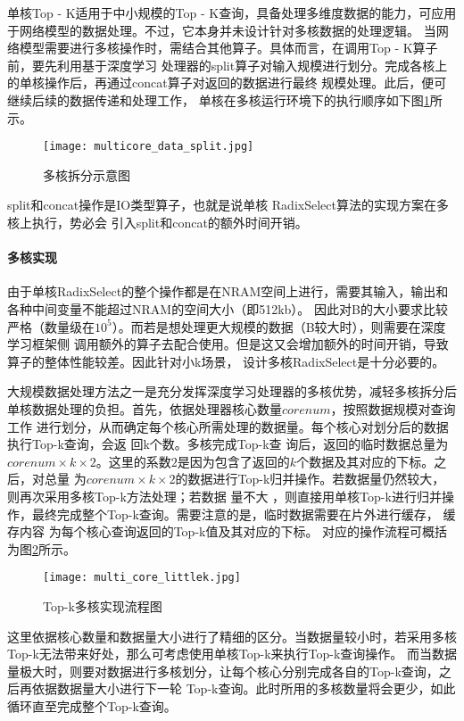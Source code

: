 单核Top - K适用于中小规模的Top - K查询，具备处理多维度数据的能力，可应用于网络模型的数据处理。不过，它本身并未设计针对多核数据的处理逻辑。
当网络模型需要进行多核操作时，需结合其他算子。具体而言，在调用Top - K算子前，要先利用基于深度学习
处理器的split算子对输入规模进行划分。完成各核上的单核操作后，再通过concat算子对返回的数据进行最终
规模处理。此后，便可继续后续的数据传递和处理工作，
单核在多核运行环境下的执行顺序如下图\ref{fig:duohe_split}所示。
\begin{figure}[ht]
    \centering
    \texttt{[image: multicore\_data\_split.jpg]}
    \caption{多核拆分示意图}
    \label{fig:duohe_split}
\end{figure}

split和concat操作是IO类型算子，也就是说单核 RadixSelect算法的实现方案在多核上执行，势必会
引入split和concat的额外时间开销。


\paragraph{多核实现}
由于单核RadixSelect的整个操作都是在NRAM空间上进行，需要其输入，输出和各种中间变量不能超过NRAM的空间大小（即512kb）。
因此对B的大小要求比较严格（数量级在$10^5$）。而若是想处理更大规模的数据（B较大时），则需要在深度学习框架侧
调用额外的算子去配合使用。但是这又会增加额外的时间开销，导致算子的整体性能较差。因此针对小k场景，
设计多核RadixSelect是十分必要的。

大规模数据处理方法之一是充分发挥深度学习处理器的多核优势，减轻多核拆分后单核数据处理的负担。首先，依据处理器核心数量\(corenum\)，按照数据规模对查询工作
进行划分，从而确定每个核心所需处理的数据量。每个核心对划分后的数据执行Top-k查询，会返
回k个数。多核完成Top-k查
询后，返回的临时数据总量为\(corenum×k×2\)。这里的系数\(2\)是因为包含了返回的\(k\)个数据及其对应的下标。之后，对总量
为\(corenum×k×2\)的数据进行Top-k归并操作。若数据量仍然较大，则再次采用多核Top-k方法处理；若数据
量不大
，则直接用单核Top-k进行归并操作，最终完成整个Top-k查询。需要注意的是，临时数据需要在片外进行缓存，
缓存内容
为每个核心查询返回的Top-k值及其对应的下标。
对应的操作流程可概括为图\ref{fig:multi_core_littlek}所示。
\begin{figure}[ht]
    \centering
    \texttt{[image: multi\_core\_littlek.jpg]}
    \caption{Top-k多核实现流程图}
    \label{fig:multi_core_littlek}
\end{figure}
    
这里依据核心数量和数据量大小进行了精细的区分。当数据量较小时，若采用多核Top-k无法带来好处，那么可考虑使用单核Top-k来执行Top-k查询操作。
而当数据量极大时，则要对数据进行多核划分，让每个核心分别完成各自的Top-k查询，之后再依据数据量大小进行下一轮
Top-k查询。此时所用的多核数量将会更少，如此循环直至完成整个Top-k查询。

